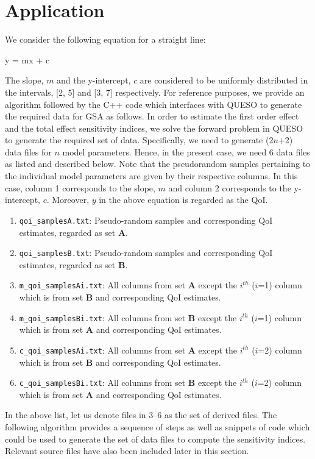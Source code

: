 \section{Application}
\label{sec:app}

We consider the following equation for a straight line:

\be y = mx + c \ee

The slope, $m$ and the y-intercept, $c$ are considered to be uniformly distributed in the intervals,
[2, 5] and [3, 7] respectively. For reference purposes, we provide an algorithm followed by the
C++ code which interfaces with QUESO to generate the required data for GSA as follows.
In order to estimate the first order effect and the total effect sensitivity indices, we solve
the forward problem in QUESO to generate the required set of data. Specifically, we need to generate
(2$n$+2) data files for $n$ model parameters. Hence, in the present case, we need 6 data files as
listed and described below. Note that the pseudorandom samples pertaining to the  individual model parameters
are given by their respective columns. In this case, column 1 corresponds to the slope, $m$ and column 2
corresponds to the y-intercept, $c$. Moreover, $y$ in the above equation is regarded as the QoI.

\begin{enumerate}
\item \texttt{qoi\_samplesA.txt}: Pseudo-random samples and corresponding QoI estimates, regarded as set $\bm A$.
\item \texttt{qoi\_samplesB.txt}: Pseudo-random samples and corresponding QoI estimates, regarded as set $\bm B$.
\item \texttt{m\_qoi\_samplesAi.txt}: All columns from set $\bm A$ except the $i^{th}$ ($i$=1) column which is from
set $\bm B$ and corresponding QoI estimates.
\item \texttt{m\_qoi\_samplesBi.txt}: All columns from set $\bm B$ except the $i^{th}$ ($i$=1) column which is from
set $\bm A$ and corresponding QoI estimates.
\item \texttt{c\_qoi\_samplesAi.txt}: All columns from set $\bm A$ except the $i^{th}$ ($i$=2) column which is from
set $\bm B$ and corresponding QoI estimates.
\item \texttt{c\_qoi\_samplesBi.txt}: All columns from set $\bm B$ except the $i^{th}$ ($i$=2) column which is from
set $\bm A$ and corresponding QoI estimates.
\end{enumerate}

In the above list, let us denote files in 3--6 as the set of derived files.  The following algorithm provides
a sequence of steps as well as snippets of code which could be used to
generate the set of data files to compute the sensitivity indices. Relevant source
files have also been included later in this section.

